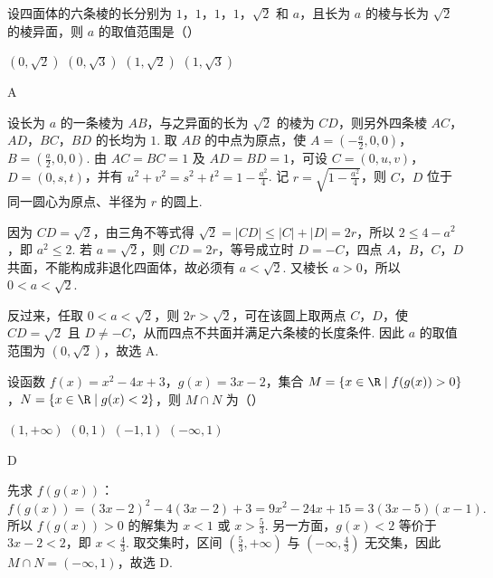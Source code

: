 \begin{problem}
设四面体的六条棱的长分别为 \(1\)，\(1\)，\(1\)，\(1\)，\(\sqrt{2}\) 和 \(a\)，且长为 \(a\) 的棱与长为 \(\sqrt{2}\) 的棱异面，则 \(a\) 的取值范围是（\quad）

\choices
    {\((0,\sqrt{2})\)}
    {\((0,\sqrt{3})\)}
    {\((1,\sqrt{2})\)}
    {\((1,\sqrt{3})\)}

\begin{answer}
A
\end{answer}

\begin{solution}
设长为 \(a\) 的一条棱为 \(AB\)，与之异面的长为 \(\sqrt2\) 的棱为 \(CD\)，则另外四条棱 \(AC\)，\(AD\)，\(BC\)，\(BD\) 的长均为 \(1\). 取 \(AB\) 的中点为原点，使 \(A=(-\frac a2,0,0)\)，\(B=(\frac a2,0,0)\). 由 \(AC=BC=1\) 及 \(AD=BD=1\)，可设 \(C=(0,u,v)\)，\(D=(0,s,t)\)，并有 \(u^2+v^2=s^2+t^2=1-\frac{a^2}{4}\). 记 \(r=\sqrt{1-\frac{a^2}{4}}\)，则 \(C\)，\(D\) 位于同一圆心为原点、半径为 \(r\) 的圆上.

因为 \(CD=\sqrt2\)，由三角不等式得 \(\sqrt2=|CD|\leq|C|+|D|=2r\)，所以 \(2\leq4-a^2\)，即 \(a^2\leq2\). 若 \(a=\sqrt2\)，则 \(CD=2r\)，等号成立时 \(D=-C\)，四点 \(A\)，\(B\)，\(C\)，\(D\) 共面，不能构成非退化四面体，故必须有 \(a<\sqrt2\). 又棱长 \(a>0\)，所以 \(0<a<\sqrt2\).

反过来，任取 \(0<a<\sqrt2\)，则 \(2r>\sqrt2\)，可在该圆上取两点 \(C\)，\(D\)，使 \(CD=\sqrt2\) 且 \(D\ne-C\)，从而四点不共面并满足六条棱的长度条件. 因此 \(a\) 的取值范围为 \((0,\sqrt2)\)，故选 A.
\end{solution}
\end{problem}

\begin{problem}
设函数 \(f(x)=x^2-4x+3\)，\(g(x)=3x-2\)，集合 \(M=\{x\in\R\mid f(g(x))>0\}\)，\(N=\{x\in\R\mid g(x)<2\}\)，则 \(M\cap N\) 为（\quad）

\choices
    {\((1,+\infty)\)}
    {\((0,1)\)}
    {\((-1,1)\)}
    {\((-\infty,1)\)}

\begin{answer}
D
\end{answer}

\begin{solution}
先求 \(f(g(x))\)：\[
f(g(x))=(3x-2)^2-4(3x-2)+3=9x^2-24x+15=3(3x-5)(x-1).
\]
所以 \(f(g(x))>0\) 的解集为 \(x<1\) 或 \(x>\frac53\). 另一方面，\(g(x)<2\) 等价于 \(3x-2<2\)，即 \(x<\frac43\). 取交集时，区间 \((\frac53,+\infty)\) 与 \((-\infty,\frac43)\) 无交集，因此 \(M\cap N=(-\infty,1)\)，故选 D.
\end{solution}
\end{problem}

